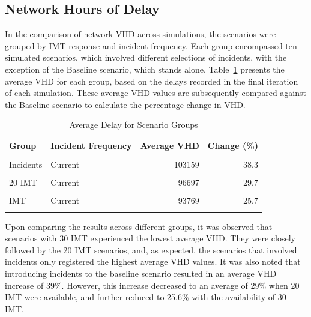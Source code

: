 \documentclass[fancy, oneside, mastersfancy, ms]{byuthesis}
\begin{document}
\hypertarget{network-hours-of-delay}{%
\subsection{Network Hours of Delay}\label{network-hours-of-delay}}

In the comparison of network VHD across simulations, the scenarios were
grouped by IMT response and incident frequency. Each group encompassed
ten simulated scenarios, which involved different selections of
incidents, with the exception of the Baseline scenario, which stands
alone. Table~\ref{tbl-network_delays_table} presents the average VHD for
each group, based on the delays recorded in the final iteration of each
simulation. These average VHD values are subsequently compared against
the Baseline scenario to calculate the percentage change in VHD.

\hypertarget{tbl-network_delays_table}{}
\begin{table}
\caption{\label{tbl-network_delays_table}Average Delay for Scenario Groups }\tabularnewline

\centering
\begin{tabular}[t]{llrr}
\toprule
\textbf{Group} & \textbf{Incident Frequency} & \textbf{Average VHD} & \textbf{Change (\%)}\\
\midrule
\cellcolor{gray!6}{Baseline} & \cellcolor{gray!6}{-} & \cellcolor{gray!6}{74568} & \cellcolor{gray!6}{0.0}\\
Incidents & Current & 103159 & 38.3\\
\cellcolor{gray!6}{Incidents} & \cellcolor{gray!6}{Increased} & \cellcolor{gray!6}{104178} & \cellcolor{gray!6}{39.7}\\
20 IMT & Current & 96697 & 29.7\\
\cellcolor{gray!6}{20 IMT} & \cellcolor{gray!6}{Increased} & \cellcolor{gray!6}{95678} & \cellcolor{gray!6}{28.3}\\
\addlinespace
30 IMT & Current & 93769 & 25.7\\
\cellcolor{gray!6}{30 IMT} & \cellcolor{gray!6}{Increased} & \cellcolor{gray!6}{93560} & \cellcolor{gray!6}{25.5}\\
\bottomrule
\end{tabular}
\end{table}

Upon comparing the results across different groups, it was observed that
scenarios with 30 IMT experienced the lowest average VHD. They were
closely followed by the 20 IMT scenarios, and, as expected, the
scenarios that involved incidents only registered the highest average
VHD values. It was also noted that introducing incidents to the baseline
scenario resulted in an average VHD increase of 39\%. However, this
increase decreased to an average of 29\% when 20 IMT were available, and
further reduced to 25.6\% with the availability of 30 IMT.
\end{document}
